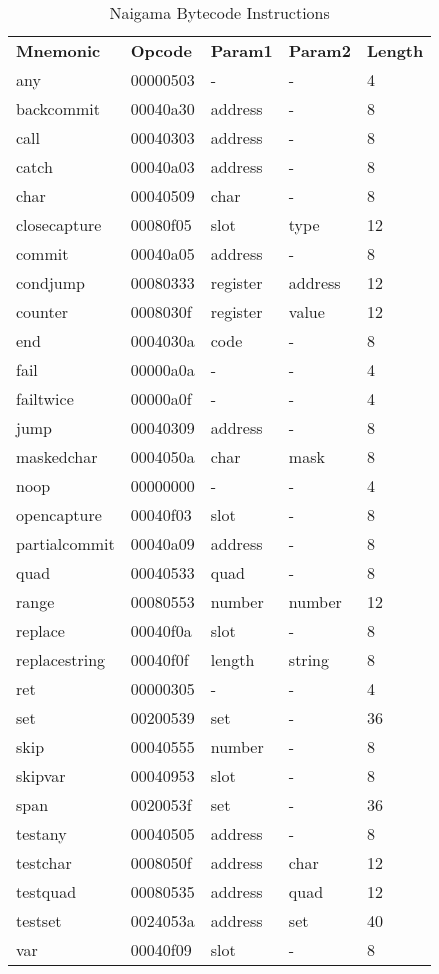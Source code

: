 
\begin{table}[]
\centering
\caption{Naigama Bytecode Instructions}
\label{tab:naig_bytecode}
\begin{tabular}{lllll}
\textbf{Mnemonic} & \textbf{Opcode} & \textbf{Param1} & \textbf{Param2} & \textbf{Length} \\
any & 00000503 & - & -  & 4 \\
backcommit & 00040a30 & address & -  & 8 \\
call & 00040303 & address & -  & 8 \\
catch & 00040a03 & address & -  & 8 \\
char & 00040509 & char & -  & 8 \\
closecapture & 00080f05 & slot & type  & 12 \\
commit & 00040a05 & address & -  & 8 \\
condjump & 00080333 & register & address  & 12 \\
counter & 0008030f & register & value  & 12 \\
end & 0004030a & code & -  & 8 \\
fail & 00000a0a & - & -  & 4 \\
failtwice & 00000a0f & - & -  & 4 \\
jump & 00040309 & address & -  & 8 \\
maskedchar & 0004050a & char & mask  & 8 \\
noop & 00000000 & - & -  & 4 \\
opencapture & 00040f03 & slot & -  & 8 \\
partialcommit & 00040a09 & address & -  & 8 \\
quad & 00040533 & quad & -  & 8 \\
range & 00080553 & number & number  & 12 \\
replace & 00040f0a & slot & -  & 8 \\
replacestring & 00040f0f & length & string  & 8 \\
ret & 00000305 & - & -  & 4 \\
set & 00200539 & set & -  & 36 \\
skip & 00040555 & number & -  & 8 \\
skipvar & 00040953 & slot & -  & 8 \\
span & 0020053f & set & -  & 36 \\
testany & 00040505 & address & -  & 8 \\
testchar & 0008050f & address & char  & 12 \\
testquad & 00080535 & address & quad  & 12 \\
testset & 0024053a & address & set  & 40 \\
var & 00040f09 & slot & -  & 8 \\
\end{tabular}
\end{table}
